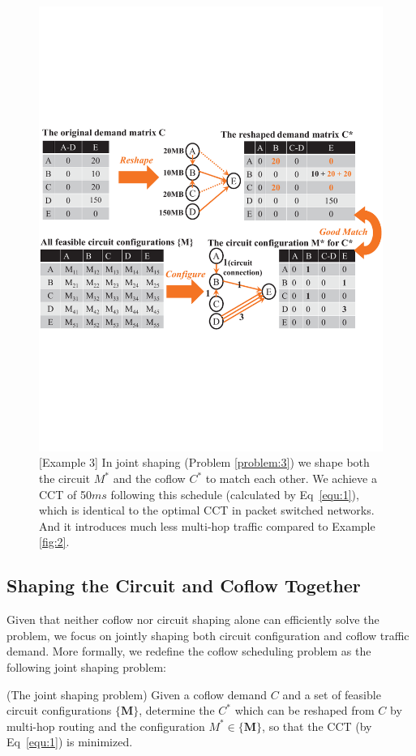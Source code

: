\begin{figure}[t]
  \centering
  \includegraphics[scale=0.38]{figures/X33}%
  \caption{[Example 3] In joint shaping (Problem \ref{problem:3}) we shape both the circuit $M^*$ and the coflow $C^*$ to match each other.
  We achieve a CCT of 50$ms$ following this schedule (calculated by Eq~\eqref{equ:1}), which is identical to the optimal CCT in packet switched networks. And it introduces much less multi-hop traffic compared to Example \ref{fig:2}.}
  \label{fig:3}
\end{figure}

\subsection{Shaping the Circuit and Coflow Together}
\label{sec:alg3}
Given that neither coflow nor circuit shaping alone can efficiently solve the problem, we focus on jointly shaping both circuit configuration and coflow traffic demand.
More formally, we redefine the coflow scheduling problem as the following joint shaping problem:
\begin{problem} (The joint shaping problem)
\label{problem:3}
Given a coflow demand $C$ and a set of feasible circuit configurations $\{\mathbf{M}\}$, determine the $C^*$ which can be reshaped from $C$ by multi-hop routing and the configuration $M^* \in \{\mathbf{M}\}$, so that the CCT (by Eq~\eqref{equ:1}) is minimized.
\end{problem}

